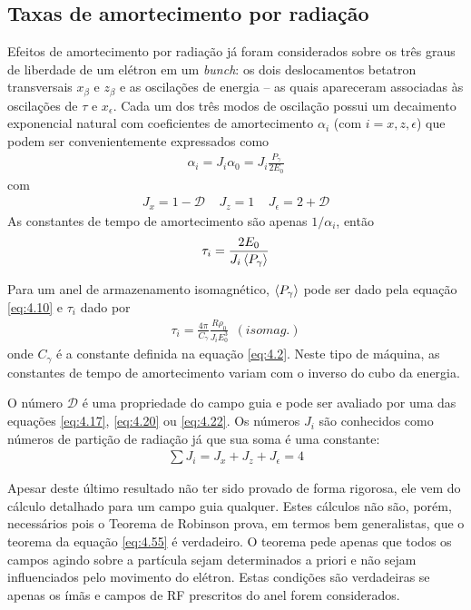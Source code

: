 \subsection{Taxas de amortecimento por radiação}\label{sec:4.4}
Efeitos de amortecimento por radiação já foram considerados sobre os três graus de liberdade de um elétron em um \textit{bunch}: os dois deslocamentos betatron transversais $x_\beta$ e $z_\beta$ e as oscilações de energia -- as quais apareceram associadas às oscilações de $\tau$ e $x_\epsilon$. Cada um dos três modos de oscilação possui um decaimento exponencial natural com coeficientes de amortecimento $\alpha_i$ (com $i=x,z,\epsilon$) que podem ser convenientemente expressados como
\begin{align}
	\alpha_i = J_i \alpha_0 = J_i\frac{P_\gamma}{2E_0}
\end{align}
com
\begin{align}
	J_x=1-\mathscr{D}\ \ \ \ \ J_z=1\ \ \ \ \ J_\epsilon=2+\mathscr{D}\label{eq:4.52}
\end{align}
As constantes de tempo de amortecimento são apenas $1/\alpha_i$, então
\begin{align}
	\tau_i = \frac{2E_0}{J_i \left< P_\gamma \right>}
\end{align}

Para um anel de armazenamento isomagnético, $\left< P_\gamma \right>$ pode ser dado pela equação \eqref{eq:4.10} e $\tau_i$ dado por
\begin{align}
	\tau_i = \frac{4\pi}{C_\gamma}\frac{R\rho_0}{J_i E_0^3}\ \ (isomag.)
\end{align}
onde $C_\gamma$ é a constante definida na equação \eqref{eq:4.2}. Neste tipo de máquina, as constantes de tempo de amortecimento variam com o inverso do cubo da energia.

O número $\mathscr{D}$ é uma propriedade do campo guia e pode ser avaliado por uma das equações \eqref{eq:4.17}, \eqref{eq:4.20} ou \eqref{eq:4.22}. Os números $J_i$ são conhecidos como números de partição de radiação já que sua soma é uma constante:
\begin{align}
	\sum J_i = J_x + J_z + J_\epsilon = 4\label{eq:4.55}
\end{align}

Apesar deste último resultado não ter sido provado de forma rigorosa, ele vem do cálculo detalhado para um campo guia qualquer. Estes cálculos não são, porém, necessários pois o Teorema de Robinson prova, em termos bem generalistas, que o teorema da equação \eqref{eq:4.55} é verdadeiro. O teorema pede apenas que todos os campos agindo sobre a partícula sejam determinados a priori e não sejam influenciados pelo movimento do elétron. Estas condições são verdadeiras se apenas os ímãs e campos de RF prescritos do anel forem considerados.

